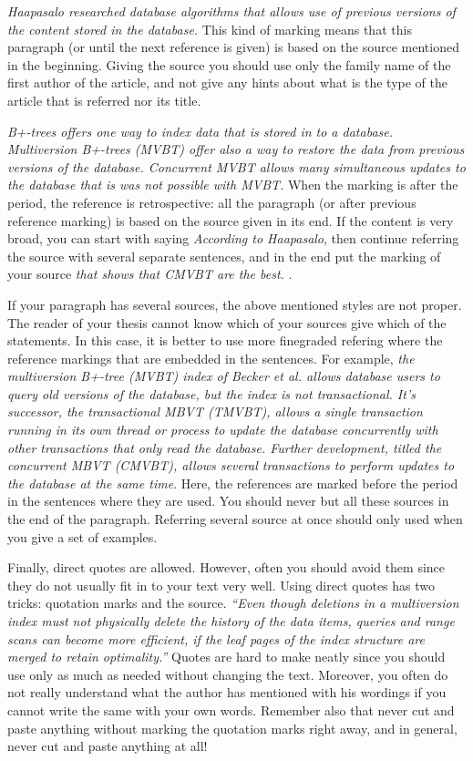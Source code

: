 \emph{Haapasalo researched database algorithms
  that allows use of previous versions of the content stored in the
  database.} This kind of marking means that this paragraph (or until
the next reference is given) is based on the source mentioned in the
beginning.  Giving the source you should use only the family name of
the first author of the article, and not give any hints about what is
the type of the article that is referred nor its title.

\emph{B+-trees offers one way to index data that is stored in to a
  database. Multiversion B+-trees (MVBT) offer also a way to restore
  the data from previous versions of the database. Concurrent MVBT
  allows many simultaneous updates to the database that is was not
  possible with MVBT.} When the marking is
after the period, the reference is retrospective: all the paragraph
(or after previous reference marking) is based on the source given in
its end. If the content is very broad, you can start with saying
\emph{According to Haapasalo}, then continue referring the source with
several separate sentences, and in the end put the marking of your
source \emph{ that shows that CMVBT are the
  best. }. 

If your paragraph has several sources, the above mentioned styles are
not proper. The reader of your thesis cannot know which of your
sources give which of the statements. In this case, it is better to
use more finegraded refering where the reference markings that are
embedded in the sentences. For example, \emph{the multiversion B+-tree
  (MVBT) index of Becker et al. allows database
  users to query old versions of the database, but the index is not
  transactional.
  It's successor, the transactional MBVT (TMVBT), allows a single transaction
  running in its own thread or process to update the database concurrently
  with other transactions that only read the
  database. 
  Further development, titled the concurrent MBVT (CMVBT),
  allows several transactions to perform updates to the database at the same
  time}. 
  Here, the references are marked before
  the period in the sentences where they are used. You should never
  but all these sources in the end of the paragraph. Referring several
  source at once should only used when you give a set of examples.

Finally, direct quotes are allowed. However, often you should avoid
them since they do not usually fit in to your text very well. Using
direct quotes has two tricks: quotation marks and the source.  \emph{
  ``Even though deletions in a multiversion index must not physically
  delete the history of the data items, queries and range scans can
  become more efficient, if the leaf pages of the index structure are
  merged to retain optimality.''} Quotes are
hard to make neatly since you should use only as much as needed
without changing the text. Moreover, you often do not really
understand what the author has mentioned with his wordings if you
cannot write the same with your own words. Remember also that never
cut and paste anything without marking the quotation marks right away,
and in general, never cut and paste anything at all!

